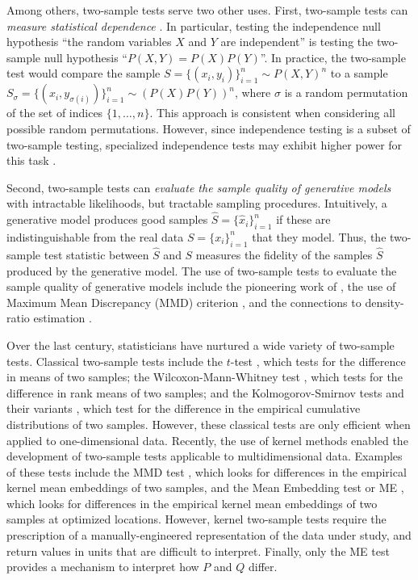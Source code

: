 \documentclass[a4paper]{article}
\begin{document}
  Among others, two-sample tests serve two other
  uses.
  First, two-sample tests can \emph{measure statistical dependence}
  \citep{gretton2012kernel}.  In particular, testing the independence null
  hypothesis ``the random variables $X$ and $Y$ are independent'' is 
  testing the two-sample null hypothesis ``$P(X,Y)=P(X)P(Y)$''. In
  practice, the two-sample test would compare the sample $S =
  \{(x_i,y_i)\}_{i=1}^n \sim P(X,Y)^n$ to a sample $S_\sigma = \{(x_i,
  y_{\sigma(i)})\}_{i=1}^n \sim (P(X)P(Y))^n$, where $\sigma$ is a random
  permutation of the set of indices $\{1, \ldots, n \}$.
  This approach is consistent when considering all possible random
  permutations. However, since independence testing is a subset of two-sample
  testing, specialized independence tests may exhibit higher power for this
  task \citep{gretton2005measuring}.

  Second, two-sample tests can \emph{evaluate the sample quality of
  generative models} with intractable likelihoods, but tractable sampling
  procedures.  Intuitively, a generative model produces good samples $\hat{S} =
  \{\hat{x}_i\}_{i=1}^n$ if these are indistinguishable from the real data
  $S=\{x_i\}_{i=1}^n$ that they model.  Thus, the two-sample test statistic
  between $\hat{S}$ and $S$ measures the fidelity of the samples $\hat{S}$
  produced by the generative model. The use of two-sample tests to evaluate the
  sample quality of generative models include the pioneering work of
  \citet{box1980sampling}, the use of Maximum Mean Discrepancy (MMD) criterion
  \citep{bengio2013bounding,karolina,lloyd2015statistical,bounliphone2015test,gretton2016},
  and the connections to density-ratio estimation
  \citep{kanamori2010,Wornowizki2016,Menon2016,Mohamed2016}.

  Over the last century, statisticians have nurtured a wide variety of
  two-sample tests. Classical two-sample tests include the $t$-test
  \citep{student1908probable}, which tests for the difference in means of two
  samples; the Wilcoxon-Mann-Whitney test
  \citep{wilcoxon1945individual,mann1947test}, which tests for the difference
  in rank means of two samples; and the Kolmogorov-Smirnov tests
  \citep{kolmogorov1933sulla,smirnov1939estimation} and their variants
  \citep{kuiper}, which test for the difference in the empirical cumulative
  distributions of two samples. However, these classical tests are only
  efficient when applied to one-dimensional data. Recently, the use of kernel
  methods \citep{smola98} enabled the development of two-sample tests
  applicable to multidimensional data. Examples of these tests include the MMD
  test \citep{gretton2012kernel}, which looks for differences in the empirical
  kernel mean embeddings of two samples, and the Mean Embedding test or ME
  \citep{jit2,metests}, which looks for differences in the empirical kernel
  mean embeddings of two samples at optimized locations. However, kernel
  two-sample tests require the prescription of a manually-engineered
  representation of the data under study, and return values in units that are
  difficult to interpret.  Finally, only the ME test provides a mechanism to
  interpret how $P$ and $Q$ differ.
\end{document}
